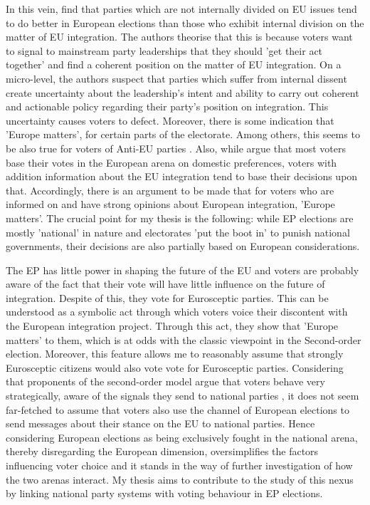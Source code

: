 In this vein,  find that parties which are not internally divided on EU issues tend to do better in European elections than those who exhibit internal division on the matter of EU integration. The authors theorise that this is because voters want to signal to mainstream party leaderships that they should 'get their act together' and find a coherent position on the matter of EU integration. On a micro-level, the authors suspect that parties which suffer from internal dissent create uncertainty about the leadership's intent and ability to carry out coherent and actionable policy regarding their party's position on integration. This uncertainty causes voters to defect.
Moreover, there is some indication that 'Europe matters', for certain parts of the electorate. Among others, this seems to be also true for voters of Anti-EU parties \cite{Hix2007}.
Also, while  argue that most voters base their votes in the European arena on domestic preferences, voters with addition information about the EU integration tend to base their decisions upon that. Accordingly, there is an argument to be made that for voters who are informed on and have strong opinions about European integration, 'Europe matters'. The crucial point for my thesis is the following: while EP elections are mostly 'national' in nature and electorates 'put the boot in'  to punish national governments, their decisions are also partially based on European considerations. 

The EP has little power in shaping the future of the EU \cite{Mair2000} and voters are probably aware of the fact that their vote will have little influence on the future of integration. Despite of this, they vote for Eurosceptic parties. This can be understood as a symbolic act through which voters voice their discontent with the European integration project. Through this act, they show that 'Europe matters' to them, which is at odds with the classic viewpoint in the Second-order election. Moreover, this feature allows me to reasonably assume that strongly Eurosceptic citizens would also vote vote for Eurosceptic parties.
Considering that proponents of the second-order model argue that voters behave very strategically, aware of the signals they send to national parties \cite{Boomgaarden2011}, it does not seem far-fetched to assume that voters also use the channel of European elections to send messages about their stance on the EU to national parties.
 Hence considering European elections as being exclusively fought in the national arena, thereby disregarding the European dimension, oversimplifies the factors influencing voter choice and it stands in the way of further investigation of how the two arenas interact. My thesis aims to contribute to the study of this nexus by linking national party systems with voting behaviour in EP elections. 

